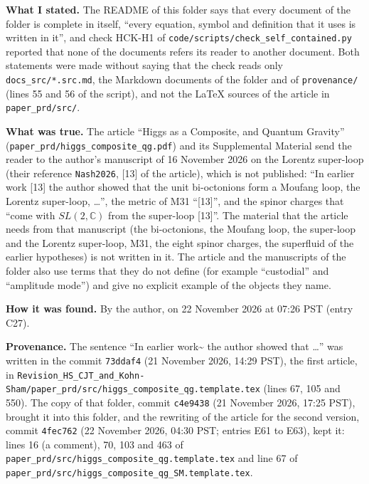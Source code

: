 \documentclass[
  10pt,
]{article}
\begin{document}
\textbf{What I stated.} The README of this folder says that every
document of the folder is complete in itself, ``every equation, symbol
and definition that it uses is written in it'', and check HCK-H1 of
\texttt{code/scripts/check\_self\_contained.py} reported that none of
the documents refers its reader to another document. Both statements
were made without saying that the check reads only
\texttt{docs\_src/*.src.md}, the Markdown documents of the folder and of
\texttt{provenance/} (lines 55 and 56 of the script), and not the LaTeX
sources of the article in \texttt{paper\_prd/src/}.

\textbf{What was true.} The article ``Higgs as a Composite, and Quantum
Gravity'' (\texttt{paper\_prd/higgs\_composite\_qg.pdf}) and its
Supplemental Material send the reader to the author's manuscript of 16
November 2026 on the Lorentz super-loop (their reference
\texttt{Nash2026}, {[}13{]} of the article), which is not published:
``In earlier work {[}13{]} the author showed that the unit bi-octonions
form a Moufang loop, the Lorentz super-loop, \ldots{}'', the metric of
M31 ``{[}13{]}'', and the spinor charges that ``come with
\(SL(2,\mathbb C)\) from the super-loop {[}13{]}''. The material that
the article needs from that manuscript (the bi-octonions, the Moufang
loop, the super-loop and the Lorentz super-loop, M31, the eight spinor
charges, the superfluid of the earlier hypotheses) is not written in it.
The article and the manuscripts of the folder also use terms that they
do not define (for example ``custodial'' and ``amplitude mode'') and
give no explicit example of the objects they name.

\textbf{How it was found.} By the author, on 22 November 2026 at 07:26
PST (entry C27).

\textbf{Provenance.} The sentence ``In earlier
work\textasciitilde{}\cite{Nash2026} the author showed that \ldots{}''
was written in the commit \texttt{73ddaf4} (21 November 2026, 14:29
PST), the first article, in
\texttt{Revision\_HS\_CJT\_and\_Kohn-Sham/paper\_prd/src/higgs\_composite\_qg.template.tex}
(lines 67, 105 and 550). The copy of that folder, commit
\texttt{c4e9438} (21 November 2026, 17:25 PST), brought it into this
folder, and the rewriting of the article for the second version, commit
\texttt{4fec762} (22 November 2026, 04:30 PST; entries E61 to E63), kept
it: lines 16 (a comment), 70, 103 and 463 of
\texttt{paper\_prd/src/higgs\_composite\_qg.template.tex} and line 67 of
\texttt{paper\_prd/src/higgs\_composite\_qg\_SM.template.tex}.
\end{document}
